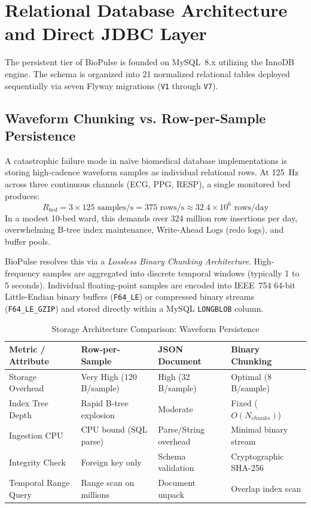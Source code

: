 \documentclass[10pt,journal,compsoc]{IEEEtran}
\begin{document}
\section{Relational Database Architecture and Direct JDBC Layer}
\label{sec:database}

The persistent tier of BioPulse is founded on MySQL~8.x utilizing the InnoDB engine. The schema is organized into 21 normalized relational tables deployed sequentially via seven Flyway migrations (\texttt{V1} through \texttt{V7}).

\subsection{Waveform Chunking vs. Row-per-Sample Persistence}
A catastrophic failure mode in naïve biomedical database implementations is storing high-cadence waveform samples as individual relational rows. At 125~Hz across three continuous channels (ECG, PPG, RESP), a single monitored bed produces:
\begin{equation}
R_{bed} = 3 \times 125 \text{ samples/s} = 375 \text{ rows/s} \approx 32.4 \times 10^6 \text{ rows/day}
\end{equation}
In a modest 10-bed ward, this demands over 324 million row insertions per day, overwhelming B-tree index maintenance, Write-Ahead Logs (redo logs), and buffer pools.

BioPulse resolves this via a \textit{Lossless Binary Chunking Architecture}. High-frequency samples are aggregated into discrete temporal windows (typically 1 to 5 seconds). Individual floating-point samples are encoded into IEEE~754 64-bit Little-Endian binary buffers (\texttt{F64\_LE}) or compressed binary streams (\texttt{F64\_LE\_GZIP}) and stored directly within a MySQL \texttt{LONGBLOB} column. 

\begin{table}[!t]
\renewcommand{\arraystretch}{1.2}
\caption{Storage Architecture Comparison: Waveform Persistence}
\label{tab:storage_comp}
\centering
\begin{tabular}{@{}llll@{}}
\toprule
\textbf{Metric / Attribute} & \textbf{Row-per-Sample} & \textbf{JSON Document} & \textbf{Binary Chunking} \\
\midrule
Storage Overhead & Very High (120 B/sample) & High (32 B/sample) & Optimal (8 B/sample) \\
Index Tree Depth & Rapid B-tree explosion & Moderate & Fixed ($O(N_{chunks})$) \\
Ingestion CPU & CPU bound (SQL parse) & Parse/String overhead & Minimal binary stream \\
Integrity Check & Foreign key only & Schema validation & Cryptographic SHA-256 \\
Temporal Range Query & Range scan on millions & Document unpack & Overlap index scan \\
\bottomrule
\end{tabular}
\end{table}
\end{document}
